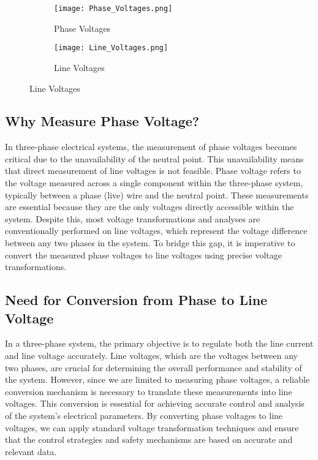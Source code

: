 \begin{figure}[h]
    \centering
    \begin{subfigure}[b]{0.4\textwidth}
        \centering
        \texttt{[image: Phase\_Voltages.png]}
        \caption{Phase Voltages}
        \label{fig:Phase Voltages}
    \end{subfigure}
    \begin{subfigure}[b]{0.4\textwidth}
        \centering
        \texttt{[image: Line\_Voltages.png]}
        \caption{Line Voltages}
        \label{fig:Line Voltages}
    \end{subfigure}
\end{figure}

\subsection{Why Measure Phase Voltage?}
In three-phase electrical systems, the measurement of phase voltages becomes
critical due to the unavailability of the neutral point. This unavailability
means that direct measurement of line voltages is not feasible. Phase voltage
refers to the voltage measured across a single component within the three-phase
system, typically between a phase (live) wire and the neutral point. These
measurements are essential because they are the only voltages directly
accessible within the system. Despite this, most voltage transformations and
analyses are conventionally performed on line voltages, which represent the
voltage difference between any two phases in the system. To bridge this gap, it
is imperative to convert the measured phase voltages to line voltages using
precise voltage transformations.

\subsection{Need for Conversion from Phase to Line Voltage}
In a three-phase system, the primary objective is to regulate both the line
current and line voltage accurately. Line voltages, which are the voltages
between any two phases, are crucial for determining the overall performance and
stability of the system. However, since we are limited to measuring phase
voltages, a reliable conversion mechanism is necessary to translate these
measurements into line voltages. This conversion is essential for achieving
accurate control and analysis of the system's electrical parameters. By
converting phase voltages to line voltages, we can apply standard voltage
transformation techniques and ensure that the control strategies and safety
mechanisms are based on accurate and relevant data.

